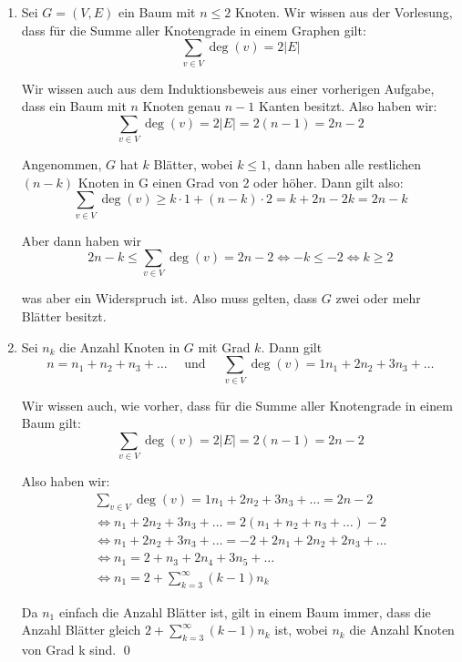 \documentclass[12pt]{article}
\begin{document}
\begin{enumerate}[label=\alph*)]
    \item Sei $G = (V, E)$ ein Baum mit $n \leq 2$ Knoten. Wir wissen aus der Vorlesung, dass für die Summe aller Knotengrade in einem Graphen gilt:
    \[
        \sum_{v \in V} \deg(v) = 2|E|
    \]

    Wir wissen auch aus dem Induktionsbeweis aus einer vorherigen Aufgabe, dass ein Baum mit $n$ Knoten genau $n-1$ Kanten besitzt. Also haben wir:
    \[
        \sum_{v \in V} \deg(v) = 2|E| = 2(n-1) = 2n-2
    \]

    Angenommen, $G$ hat $k$ Blätter, wobei $k \leq 1$, dann haben alle restlichen $(n - k)$ Knoten in G einen Grad von 2 oder höher. Dann gilt also:
    \[
        \sum_{v \in V} \deg(v) \geq k \cdot 1 +  (n - k) \cdot 2 = k + 2n - 2k = 2n - k
    \]

    Aber dann haben wir
    \[
        2n - k \leq \sum_{v \in V} \deg(v) = 2n-2 \iff - k \leq -2 \iff k \geq 2
    \]

    was aber ein Widerspruch ist. Also muss gelten, dass $G$ zwei oder mehr Blätter besitzt.

    \item Sei $n_k$ die Anzahl Knoten in $G$ mit Grad $k$. Dann gilt
    \[
        n = n_1 + n_2 + n_3 + \dots \quad\text{ und }\quad \sum_{v \in V} \deg(v) = 1n_1 + 2n_2 + 3n_3 + \dots
    \]

    Wir wissen auch, wie vorher, dass für die Summe aller Knotengrade in einem Baum gilt:
    \[
        \sum_{v \in V} \deg(v) = 2|E| = 2(n-1) = 2n-2
    \]

    Also haben wir:
    \begin{gather*}
        \sum_{v \in V} \deg(v) = 1n_1 + 2n_2 + 3n_3 + \dots = 2n-2 \\
        \iff n_1 + 2n_2 + 3n_3 + \dots = 2(n_1 + n_2 + n_3 + \dots) - 2 \\
        \iff n_1 + 2n_2 + 3n_3 + \dots = -2 + 2n_1 + 2n_2 + 2n_3 + \dots \\
        \iff n_1 = 2 + n_3 + 2n_4 + 3n_5 + \dots \\
        \iff n_1 = 2 + \sum_{k = 3}^{\infty} (k-1)n_k
    \end{gather*}

    Da $n_1$ einfach die Anzahl Blätter ist, gilt in einem Baum immer, dass die Anzahl Blätter gleich $2 + \sum_{k = 3}^{\infty} (k-1)n_k$ ist, wobei $n_k$ die Anzahl Knoten von Grad k sind. \qed
\end{enumerate}
\end{document}
